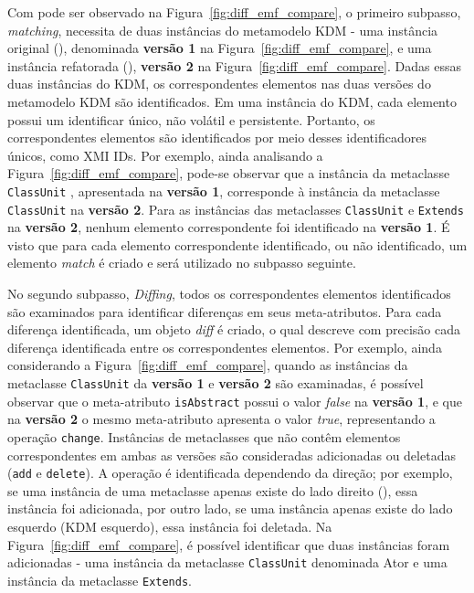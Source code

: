 Com pode ser observado na Figura~\ref{fig:diff_emf_compare}, o primeiro subpasso, \textit{matching}, necessita de duas instâncias do metamodelo KDM - uma instância original (), denominada \textbf{versão 1} na Figura~\ref{fig:diff_emf_compare}, e uma instância refatorada (), \textbf{versão 2} na Figura~\ref{fig:diff_emf_compare}. Dadas essas duas instâncias do KDM, os correspondentes elementos nas duas versões do metamodelo KDM são identificados. Em uma instância do KDM, cada elemento possui um identificar único, não volátil e persistente. Portanto, os correspondentes elementos são identificados por meio desses identificadores únicos, como XMI IDs. Por exemplo, ainda analisando a Figura~\ref{fig:diff_emf_compare}, pode-se observar que a instância da metaclasse \texttt{ClassUnit} , apresentada na \textbf{versão 1}, corresponde à instância da metaclasse \texttt{ClassUnit}  na \textbf{versão 2}. Para as instâncias das metaclasses \texttt{ClassUnit}  e \texttt{Extends} na \textbf{versão 2}, nenhum elemento correspondente foi identificado na \textbf{versão 1}. É visto que para cada elemento correspondente identificado, ou não identificado, um elemento \textit{match} é criado e será utilizado no subpasso seguinte.

No segundo subpasso, \textit{Diffing}, todos os correspondentes elementos identificados são examinados para identificar diferenças em seus meta-atributos. Para cada diferença identificada, um objeto \textit{diff} é criado, o qual descreve com precisão cada diferença identificada entre os correspondentes elementos. Por exemplo, ainda considerando a Figura~\ref{fig:diff_emf_compare}, quando as instâncias da metaclasse \texttt{ClassUnit}  da \textbf{versão 1} e \textbf{versão 2} são examinadas, é possível observar que o meta-atributo \texttt{isAbstract} possui o valor \textit{false} na \textbf{versão 1}, e que na \textbf{versão 2} o mesmo meta-atributo apresenta o valor \textit{true}, representando a operação \texttt{change}. Instâncias de metaclasses que não contêm elementos correspondentes em ambas as versões são consideradas adicionadas ou deletadas (\texttt{add} e \texttt{delete}). A operação é identificada dependendo da direção; por exemplo, se uma instância de uma metaclasse apenas existe do lado direito (), essa instância foi adicionada, por outro lado, se uma instância apenas existe do lado esquerdo (KDM esquerdo), essa instância foi deletada. Na Figura~\ref{fig:diff_emf_compare}, é possível identificar que duas instâncias foram adicionadas - uma instância da metaclasse \texttt{ClassUnit} denominada Ator e uma instância da metaclasse \texttt{Extends}.

